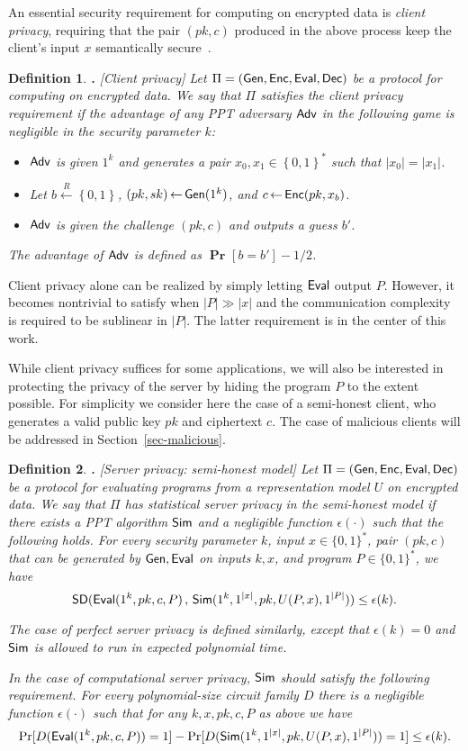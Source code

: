 \documentclass[11pt]{article}
\newcommand{\SD}{{\sf SD }}
\renewcommand{\sim}{{\sf Sim}}
\newcommand{\adv}{{\sf Adv }}
\newcommand{\fnrngdom}[2]{#1\to#2}
\newcommand{\fndef}[3]{{#1\,:\,\fnrngdom{#2}{#3}}}
\newcommand{\set}[1]{\left\{#1\right\}}
\newcommand{\size}[1]{|#1|}
\newtheorem{DEFINITION}{Definition}[section]
\newenvironment{definition}{\begin{DEFINITION} \hspace{-.85em} {\bf .} \rm}%
	{\end{DEFINITION}}
\newcommand{\from}{{\,\leftarrow\,}}
\newcommand{\prob}[2][]{{\mathop{\mathbf{Pr}}_{#1}\!{\left[{#2}\right]}}}
\newcommand{\samp}[2]{#1\from #2}
\newcommand{\usamp}[2]{#1\stackrel{R}{\leftarrow}#2}
\newcommand{\bools}[1][]{{\set{0,1}}^{#1}}
\newcommand{\gen}{{\sf Gen}}
\newcommand{\enc}{{\sf Enc}}
\newcommand{\eval}{{\sf Eval}}
\newcommand{\dec}{{\sf Dec}}
\newcommand{\eps}{{\epsilon}}
\begin{document}
An essential security requirement for computing on encrypted data is
{\em client privacy}, requiring that the pair $(pk,c)$ produced in
the above process keep the client's input $x$ semantically
secure~\cite{GM,Goldbook}.
\begin{definition}[Client privacy]
\label{def-clientprivacy} Let $\Pi=(\gen,\enc,\eval,\dec)$ be a
protocol for computing on encrypted data. We say that $\Pi$
satisfies the {\em client privacy} requirement if the advantage of
any PPT adversary $\adv$ in the following game is negligible in the
security parameter $k$:
\begin{itemize}
\item $\adv$ is given $1^k$ and generates a pair
$x_0,x_1\in\bools[*]$ such that $\size{x_0}=\size{x_1}$.
\item Let $\usamp{b}{\bools}$, $\samp{(pk,sk)}{\gen(1^k)}$,
and $\samp{c}{\enc(pk,x_b)}$.
\item $\adv$ is given the challenge $(pk,c)$ and outputs a guess $b'$.
\end{itemize}
The advantage of $\adv$ is defined as $\prob{b=b'}-1/2$.
\end{definition}
Client privacy alone can be realized by simply letting $\eval$
output $P$. However, it becomes nontrivial to satisfy when
$\size{P}\gg \size{x}$ and the communication complexity is required
to be sublinear in $\size{P}$. The latter requirement is in the
center of this work.

While client privacy suffices for some applications, we will also be
interested in protecting the privacy of the server by hiding the
program $P$ to the extent possible.  For simplicity we consider here
the case of a semi-honest client, who generates a valid public key
$pk$ and ciphertext $c$. The case of malicious clients will be
addressed in Section~\ref{sec-malicious}.

\begin{definition}[Server privacy: semi-honest model]
\label{def-serverprivacy} Let $\Pi=(\gen,\enc,\eval,\dec)$ be a
protocol for evaluating programs from a representation model
$U$ on encrypted data. We say that $\Pi$ has {\em statistical
server privacy in the semi-honest model} if there exists a PPT
algorithm $\sim$ and a negligible function $\eps(\cdot)$ such that
the following holds. For every security parameter $k$, input
$x\in\{0,1\}^*$, pair $(pk,c)$ that can be generated by
$\gen,\eval$ on inputs $k,x$, and program $P\in\{0,1\}^*$, we have
\[ \SD(\eval(1^k,pk,c,P)\,,\,\sim(1^k, 1^{|x|},
pk, U(P,x), 1^{\size{P}})) \le \epsilon(k).\]

The case of {\em  perfect server privacy} is defined
similarly, except that
$\eps(k)=0$ and $\sim$ is allowed to run in expected polynomial
time.

In the case of {\em computational server privacy}, $\sim$ should
satisfy the following requirement. For every polynomial-size circuit
family $D$ there is a negligible function $\eps(\cdot)$ such that
for any $k,x,pk,c,P$ as above we have
\[ \Pr[D(\eval(1^k,pk,c,P))=1]-\Pr[D(\sim(1^k, 1^{|x|},
pk, U(P,x), 1^{\size{P}}))=1]
\le \eps(k).\]
\end{definition}
\end{document}
